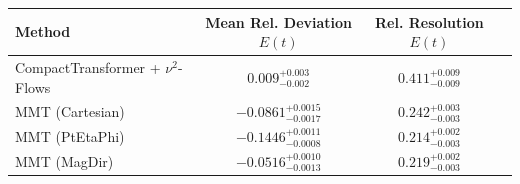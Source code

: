     \begin{tabular}{lccc}
        \toprule
        Method & Mean Rel. Deviation $E(t)$ & Rel. Resolution $E(t)$ \\
        \midrule
        CompactTransformer + $\nu^2$-Flows & $0.009^{+0.003}_{-0.002}$ & $0.411^{+0.009}_{-0.009}$ \\
        MMT (Cartesian) & $-0.0861^{+0.0015}_{-0.0017}$ & $0.242^{+0.003}_{-0.003}$ \\
        MMT (PtEtaPhi) & $-0.1446^{+0.0011}_{-0.0008}$ & $0.214^{+0.002}_{-0.003}$ \\
        MMT (MagDir) & $-0.0516^{+0.0010}_{-0.0013}$ & $0.219^{+0.002}_{-0.003}$ \\
        \bottomrule
    \end{tabular}